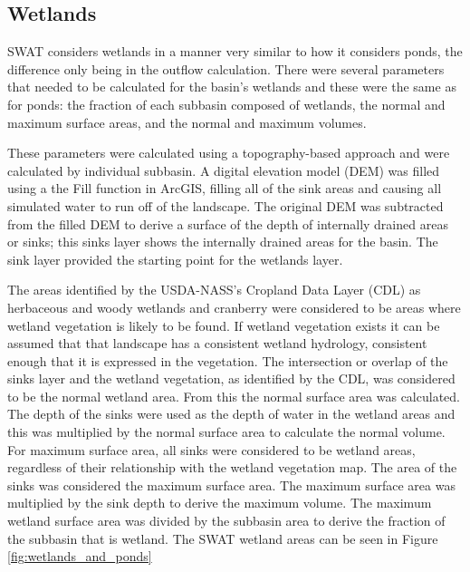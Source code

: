 \subsection{Wetlands}\label{sec:wetlands}

	SWAT considers wetlands in a manner very similar to how it considers ponds, the difference only being in the outflow calculation. There were several parameters that needed to be calculated for the basin's wetlands and these were the same as for ponds: the fraction of each subbasin composed of wetlands, the normal and maximum surface areas, and the normal and maximum volumes. 
	
	These parameters were calculated using a topography-based approach and were calculated by individual subbasin. A digital elevation model (DEM) was filled using a the Fill function in ArcGIS, filling all of the sink areas and causing all simulated water to run off of the landscape. The original DEM was subtracted from the filled DEM to derive a surface of the depth of internally drained areas or sinks; this sinks layer shows the internally drained areas for the basin. The sink layer provided the starting point for the wetlands layer. 
	
	The areas identified by the USDA-NASS's Cropland Data Layer (CDL) as herbaceous and woody wetlands and cranberry were considered to be areas where wetland vegetation is likely to be found. If wetland vegetation exists it can be assumed that that landscape has a consistent wetland hydrology, consistent enough that it is expressed in the vegetation. The intersection or overlap of the sinks layer and the wetland vegetation, as identified by the CDL, was considered to be the normal wetland area. From this the normal surface area was calculated. The depth of the sinks were used as the depth of water in the wetland areas and this was multiplied by the normal surface area to calculate the normal volume. For maximum surface area, all sinks were considered to be wetland areas, regardless of their relationship with the wetland vegetation map. The area of the sinks was considered the maximum surface area. The maximum surface area was multiplied by the sink depth to derive the maximum volume. The maximum wetland surface area was divided by the subbasin area to derive the fraction of the subbasin that is wetland. The SWAT wetland areas can be seen in Figure \ref{fig:wetlands_and_ponds}
	
